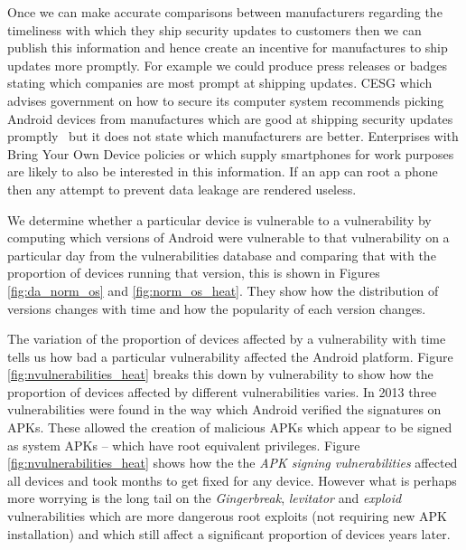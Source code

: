 \documentclass[a4paper,twocolumn]{article}
\begin{document}
Once we can make accurate comparisons between manufacturers regarding the timeliness with which they ship security updates to customers then we can publish this information and hence create an incentive for manufactures to ship updates more promptly.
For example we could produce press releases or badges stating which companies are most prompt at shipping updates.
CESG which advises government on how to secure its computer system recommends picking Android devices from manufactures which are good at shipping security updates promptly~\cite{CESG2013} but it does not state which manufacturers are better.
Enterprises with Bring Your Own Device policies or which supply smartphones for work purposes are likely to also be interested in this information.
If an app can root a phone then any attempt to prevent data leakage are rendered useless.

We determine whether a particular device is vulnerable to a vulnerability by computing which versions of Android were vulnerable to that vulnerability on a particular day from the vulnerabilities database and comparing that with the proportion of devices running that version, this is shown in Figures \ref{fig:da_norm_os} and \ref{fig:norm_os_heat}.
They show how the distribution of versions changes with time and how the popularity of each version changes.

The variation of the proportion of devices affected by a vulnerability with time tells us how bad a particular vulnerability affected the Android platform.
Figure \ref{fig:nvulnerabilities_heat} breaks this down by vulnerability to show how the proportion of devices affected by different vulnerabilities varies.
In 2013 three vulnerabilities were found in the way which Android verified the signatures on APKs.
These allowed the creation of malicious APKs which appear to be signed as system APKs -- which have root equivalent privileges.
Figure \ref{fig:nvulnerabilities_heat} shows how the the \emph{APK signing vulnerabilities} affected all devices and took months to get fixed for any device.
However what is perhaps more worrying is the long tail on the \emph{Gingerbreak}, \emph{levitator} and \emph{exploid} vulnerabilities which are more dangerous root exploits (not requiring new APK installation) and which still affect a significant proportion of devices years later.
\end{document}
